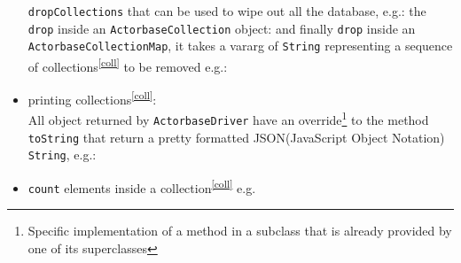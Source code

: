 \documentclass{scalatekids-article}
\begin{document}
\begin{itemize}
  \verb=dropCollections= that can be used to wipe out all the database, e.g.:
  the \verb=drop= inside an \verb=ActorbaseCollection= object:
  and finally \verb=drop= inside an \verb=ActorbaseCollectionMap=, it takes a
  vararg of \verb=String= representing a sequence of collections\textsuperscript{\ref{coll}} to be removed
  e.g.:
\item printing collections\textsuperscript{\ref{coll}}:\\All object returned by \verb=ActorbaseDriver=
  have an override\footnote{Specific implementation of a method in a subclass that
    is already provided by one of its superclasses} to the method \verb=toString=
  that return a pretty formatted JSON(JavaScript Object Notation) \verb=String=, e.g.:
\item \verb=count= elements inside a collection\textsuperscript{\ref{coll}} e.g.


\end{itemize}
\end{document}
